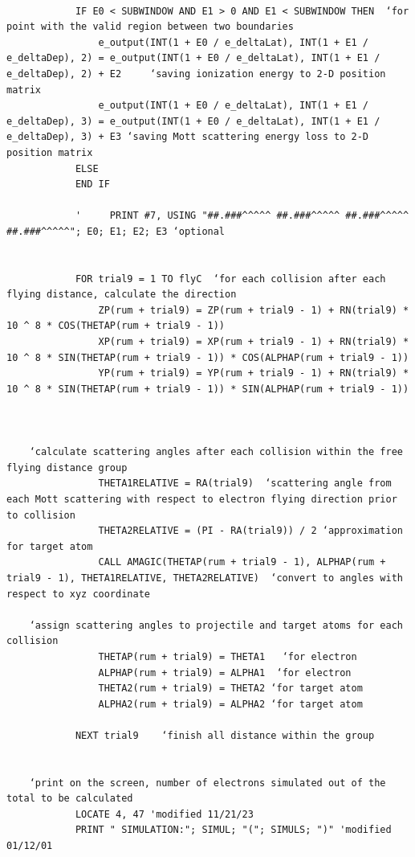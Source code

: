 \documentclass[10pt, reqno]{exam}
\begin{document}
\begin{verbatim}
    
            IF E0 < SUBWINDOW AND E1 > 0 AND E1 < SUBWINDOW THEN  ‘for point with the valid region between two boundaries
                e_output(INT(1 + E0 / e_deltaLat), INT(1 + E1 / e_deltaDep), 2) = e_output(INT(1 + E0 / e_deltaLat), INT(1 + E1 / e_deltaDep), 2) + E2     ‘saving ionization energy to 2-D position matrix
                e_output(INT(1 + E0 / e_deltaLat), INT(1 + E1 / e_deltaDep), 3) = e_output(INT(1 + E0 / e_deltaLat), INT(1 + E1 / e_deltaDep), 3) + E3 ‘saving Mott scattering energy loss to 2-D position matrix
            ELSE
            END IF
    
            '     PRINT #7, USING "##.###^^^^^ ##.###^^^^^ ##.###^^^^^ ##.###^^^^^"; E0; E1; E2; E3 ‘optional
    
    
            FOR trial9 = 1 TO flyC  ‘for each collision after each flying distance, calculate the direction 
                ZP(rum + trial9) = ZP(rum + trial9 - 1) + RN(trial9) * 10 ^ 8 * COS(THETAP(rum + trial9 - 1))
                XP(rum + trial9) = XP(rum + trial9 - 1) + RN(trial9) * 10 ^ 8 * SIN(THETAP(rum + trial9 - 1)) * COS(ALPHAP(rum + trial9 - 1))
                YP(rum + trial9) = YP(rum + trial9 - 1) + RN(trial9) * 10 ^ 8 * SIN(THETAP(rum + trial9 - 1)) * SIN(ALPHAP(rum + trial9 - 1))
    
    
    
    ‘calculate scattering angles after each collision within the free flying distance group
                THETA1RELATIVE = RA(trial9)  ‘scattering angle from each Mott scattering with respect to electron flying direction prior to collision 
                THETA2RELATIVE = (PI - RA(trial9)) / 2 ‘approximation for target atom
                CALL AMAGIC(THETAP(rum + trial9 - 1), ALPHAP(rum + trial9 - 1), THETA1RELATIVE, THETA2RELATIVE)  ‘convert to angles with respect to xyz coordinate
    
    ‘assign scattering angles to projectile and target atoms for each collision
                THETAP(rum + trial9) = THETA1   ‘for electron
                ALPHAP(rum + trial9) = ALPHA1  ‘for electron
                THETA2(rum + trial9) = THETA2 ‘for target atom
                ALPHA2(rum + trial9) = ALPHA2 ‘for target atom
    
            NEXT trial9    ‘finish all distance within the group
    
    
    ‘print on the screen, number of electrons simulated out of the total to be calculated 
            LOCATE 4, 47 'modified 11/21/23
            PRINT " SIMULATION:"; SIMUL; "("; SIMULS; ")" 'modified 01/12/01
            

\end{verbatim}
\end{document}
